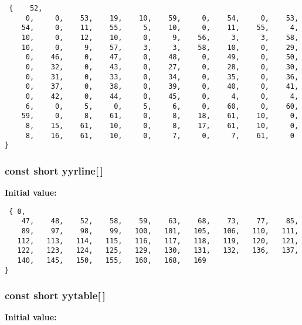 \footnotesize\begin{verbatim} {    52,
     0,     0,    53,    19,    10,    59,     0,    54,     0,    53,
    54,     0,    11,    55,     5,    10,     0,    11,    55,     4,
    10,     0,    12,    10,     0,     9,    56,     3,     3,    58,
    10,     0,     9,    57,     3,     3,    58,    10,     0,    29,
     0,    46,     0,    47,     0,    48,     0,    49,     0,    50,
     0,    32,     0,    43,     0,    27,     0,    28,     0,    30,
     0,    31,     0,    33,     0,    34,     0,    35,     0,    36,
     0,    37,     0,    38,     0,    39,     0,    40,     0,    41,
     0,    42,     0,    44,     0,    45,     0,     4,     0,     4,
     6,     0,     5,     0,     5,     6,     0,    60,     0,    60,
    59,     0,     8,    61,     0,     8,    18,    61,    10,     0,
     8,    15,    61,    10,     0,     8,    17,    61,    10,     0,
     8,    16,    61,    10,     0,     7,     0,     7,    61,     0
}\end{verbatim}\normalsize 
{}
\subsubsection{\setlength{\rightskip}{0pt plus 5cm}const short yyrline[$\,$]\hspace{0.3cm}{\tt  [static]}}\label{vcd__parser_8c_a86}


{\bf Initial value:}

\footnotesize\begin{verbatim} { 0,
    47,    48,    52,    58,    59,    63,    68,    73,    77,    85,
    89,    97,    98,    99,   100,   101,   105,   106,   110,   111,
   112,   113,   114,   115,   116,   117,   118,   119,   120,   121,
   122,   123,   124,   125,   129,   130,   131,   132,   136,   137,
   140,   145,   150,   155,   160,   168,   169
}\end{verbatim}\normalsize 
{}
\subsubsection{\setlength{\rightskip}{0pt plus 5cm}const short yytable[$\,$]\hspace{0.3cm}{\tt  [static]}}\label{vcd__parser_8c_a94}


{\bf Initial value:}

